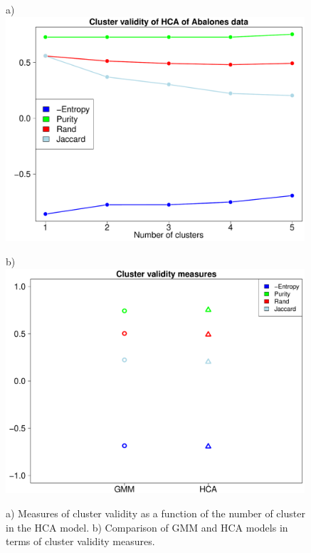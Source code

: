 \documentclass[10pt, paper=a4]{article}
\begin{document}
\begin{figure}[h!]
  \begin{minipage}{0.49\textwidth}
    a)\\
    \includegraphics[width = 0.99\textwidth]{HClust_validity.pdf}
  \end{minipage} \hfill
  \begin{minipage}{0.49\textwidth}
    b)\\
    \includegraphics[width = 0.99\textwidth]{Cluster_comparison.pdf}
  \end{minipage} \vfill
  \caption{a) Measures of cluster validity as a function of the number of
    cluster in the HCA model.  b) Comparison of GMM and HCA models in terms of
    cluster validity measures.}
  \label{fig:clust_quality}
\end{figure}
\end{document}
